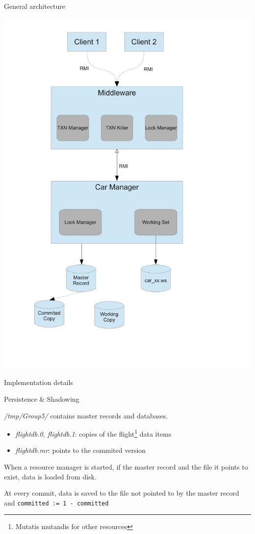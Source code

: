 \documentclass{beamer}
\begin{document}
\begin{frame}{General architecture}
  \begin{center}
    \includegraphics[scale=0.3]{architecture.pdf}
  \end{center}
\end{frame}



\begin{frame}
  \Huge{Implementation details}
\end{frame}


\begin{frame}{Persistence \& Shadowing}

  \emph{/tmp/Group5/} contains master records and databases.


  \begin{itemize}
    \item {\it flightdb.0, flightdb.1}: copies of the flight\footnote{Mutatis mutandis for other resources} data items
    \item {\it flightdb.mr}: points to the commited version
  \end{itemize}

  When a resource manager is started, if the master record and the
  file it points to exist, data is loaded from disk.

  At every commit, data is saved to the file not pointed to by the
  master record and {\tt committed := 1 - committed}
\end{frame}
\end{document}
